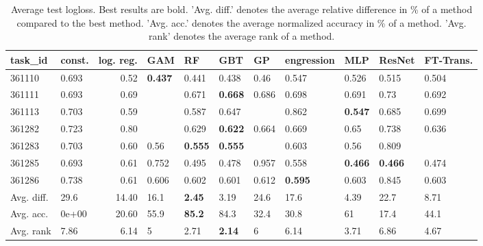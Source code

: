 \begin{table}[ht!]
\centering
\begingroup\footnotesize
\begin{tabular}{llrllllllll}
  \hline
\hline
task\_id & const. & log. reg. & GAM & RF & GBT & GP & engression & MLP & ResNet & FT-Trans. \\ 
  \hline
361110 & 0.693 & 0.52 & \textbf{0.437} & 0.441 & 0.438 & 0.46 & 0.547 & 0.526 & 0.515 & 0.504 \\ 
  361111 & 0.693 & 0.69 &  & 0.671 & \textbf{0.668} & 0.686 & 0.698 & 0.691 & 0.73 & 0.692 \\ 
  361113 & 0.703 & 0.59 &  & 0.587 & 0.647 &  & 0.862 & \textbf{0.547} & 0.685 & 0.699 \\ 
  361282 & 0.723 & 0.80 &  & 0.629 & \textbf{0.622} & 0.664 & 0.669 & 0.65 & 0.738 & 0.636 \\ 
  361283 & 0.703 & 0.60 & 0.56 & \textbf{0.555} & \textbf{0.555} &  & 0.603 & 0.56 & 0.809 &  \\ 
  361285 & 0.693 & 0.61 & 0.752 & 0.495 & 0.478 & 0.957 & 0.558 & \textbf{0.466} & \textbf{0.466} & 0.474 \\ 
  361286 & 0.738 & 0.61 & 0.606 & 0.602 & 0.601 & 0.612 & \textbf{0.595} & 0.603 & 0.845 & 0.603 \\ 
   \hline
Avg. diff. & 29.6 & 14.40 & 16.1 & \textbf{2.45} & 3.19 & 24.6 & 17.6 & 4.39 & 22.7 & 8.71 \\ 
  Avg. acc. & 0e+00 & 20.60 & 55.9 & \textbf{85.2} & 84.3 & 32.4 & 30.8 & 61 & 17.4 & 44.1 \\ 
  Avg. rank & 7.86 & 6.14 & 5 & 2.71 & \textbf{2.14} & 6 & 6.14 & 3.71 & 6.86 & 4.67 \\ 
   \hline
\hline
\end{tabular}
\endgroup
\caption{Average test logloss. 
                  Best results are bold. 
                  'Avg. diff.' denotes the average relative difference in \% of a method compared to the best method.
                  'Avg. acc.' denotes the average normalized accuracy in \% of a method.
                  'Avg. rank' denotes the average rank of a method.} 
\label{TABLES/table_results_logloss_umap_num_and_cat_features}
\end{table}
